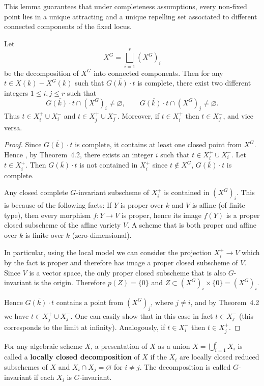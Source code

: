 \documentclass[12pt]{article}
\begin{document}
This lemma guarantees that under completeness assumptions, every non-fixed point lies in a unique attracting and a unique repelling set associated to different connected components of the fixed locus.
\begin{lemma}[4.1]
Let 
\[
  X^G = \bigsqcup_{i=1}^r (X^G)_i
\]
be the decomposition of $X^G$ into connected components.  
Then for any $t \in X(k) - X^G(k)$ such that $\overline{G(k)\cdot t}$ is complete, 
there exist two different integers $1 \le i,j \le r$ such that 
\[
  \overline{G(k)\cdot t} \cap (X^G)_i \ne \varnothing, 
  \qquad 
  \overline{G(k)\cdot t} \cap (X^G)_j \ne \varnothing.
\]
Thus $t \in X_i^+ \cup X_i^-$ and $t \in X_j^+ \cup X_j^-$.  
Moreover, if $t \in X_i^+$ then $t \in X_j^-$, and vice versa.
\end{lemma}

\begin{proof}
Since $\overline{G(k)\cdot t}$ is complete, it contains at least one closed point from $X^G$.  
Hence , by Theorem~4.2, there exists an integer $i$ such that 
$t \in X_i^+ \cup X_i^-$.  
Let $t \in X_i^+$.  
Then $\overline{G(k)\cdot t}$ is not contained in $X_i^+$ since $t \notin X^G$, $\overline{G(k)\cdot t}$ is complete.

Any closed complete $G$-invariant subscheme of $X_i^+$ is contained in $(X^G)_i$. This is because of the following facts: If $Y$ is proper over $k$ and $V$ is affine (of finite type), then every morphism $f: Y \to V$ is proper, hence its image $f(Y)$ is a proper closed subscheme of the affine variety $V$. A scheme that is both proper and affine over $k$ is finite over $k$ (zero-dimensional).

In particular, using the local model we can consider the projection $X_i^+ \to V$ which by the fact is proper and therefore has image a proper closed subscheme of $V$. Since $V$ is a vector space, the only proper closed subscheme that is also $G$-invariant is the origin. Therefore $p(Z)=\{0\}$ and
$Z \subset (X^G)_i \times \{0\} = (X^G)_i$.

Hence $\overline{G(k)\cdot t}$ contains a point from $(X^G)_j$, where $j \ne i$, 
and by Theorem~4.2 we have $t \in X_j^+ \cup X_j^-$.  
One can easily show that in this case in fact $t \in X_j^-$ (this corresponds to the limit at infinity).  Analogously, if $t \in X_i^-$ then $t \in X_j^+$.
\end{proof}

\begin{definition}
   For any algebraic scheme $X$, a presentation of $X$ as a union $X = \bigcup_{i=1}^r X_i$ is called a \textbf{locally closed decomposition} of $X$ if the $X_i$ are locally closed reduced subschemes of $X$ and $X_i \cap X_j = \varnothing$ for $i \neq j$. The decomposition is called $G$-invariant if each $X_i$ is $G$-invariant.
\end{definition}
\end{document}
